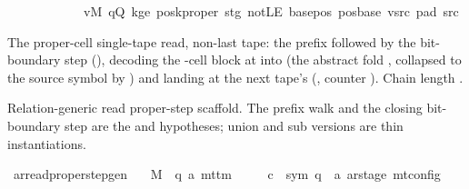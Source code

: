 \begin{isabellebody}
\ \ \ \ \ \ \ \ \ \ \ \ vM\ qQ\ kge{}\ posk{\isacharunderscore}{\kern0pt}proper\ stg\ notLE\ base{\isacharunderscore}{\kern0pt}pos\ pos{\isacharunderscore}{\kern0pt}base\ vsrc\ pad{}\ src{}{\isacharbrackright}{\kern0pt}{\isacharparenright}{\kern0pt}%
\endisatagproof
{\isafoldproof}%
%
\isadelimproof
%
\endisadelimproof
%
\begin{isamarkuptext}%
The proper-cell single-tape read, non-last tape: the prefix
  followed by the bit-boundary step (),
  decoding the -cell block at  into 
  (the abstract fold , collapsed to the source symbol by
  ) and landing at the next tape's
   (, counter ).  Chain length
  .%
\end{isamarkuptext}\isamarkuptrue%
%
\begin{isamarkuptext}%
Relation-generic read proper-step scaffold.  The prefix walk
  and the closing bit-boundary step are the  and
   hypotheses; union and sub versions are thin
  instantiations.%
\end{isamarkuptext}\isamarkuptrue%
\isamarkupfalse%
\ ar{\isacharunderscore}{\kern0pt}read{\isacharunderscore}{\kern0pt}proper{\isacharunderscore}{\kern0pt}step{\isacharunderscore}{\kern0pt}gen{\isacharcolon}{\kern0pt}\isanewline
\ \ \ M\ {\isacharcolon}{\kern0pt}{\isacharcolon}{\kern0pt}\ {\isachardoublequoteopen}{\isacharparenleft}{\kern0pt}{\isacharprime}{\kern0pt}q{\isacharcomma}{\kern0pt}\ {\isacharprime}{\kern0pt}a{\isacharparenright}{\kern0pt}\ mttm{\isachardoublequoteclose}\isanewline
\ \ \ \ \ c{\isacharprime}{\kern0pt}\ {\isacharcolon}{\kern0pt}{\isacharcolon}{\kern0pt}\ {\isachardoublequoteopen}{\isacharparenleft}{\kern0pt}sym{}{\isacharcomma}{\kern0pt}\ {\isacharprime}{\kern0pt}q\ {\isasymtimes}\ {\isacharprime}{\kern0pt}a\ ar{\isacharunderscore}{\kern0pt}stage{\isacharparenright}{\kern0pt}\ mt{\isacharunderscore}{\kern0pt}config{\isachardoublequoteclose}\isanewline

\end{isabellebody}
